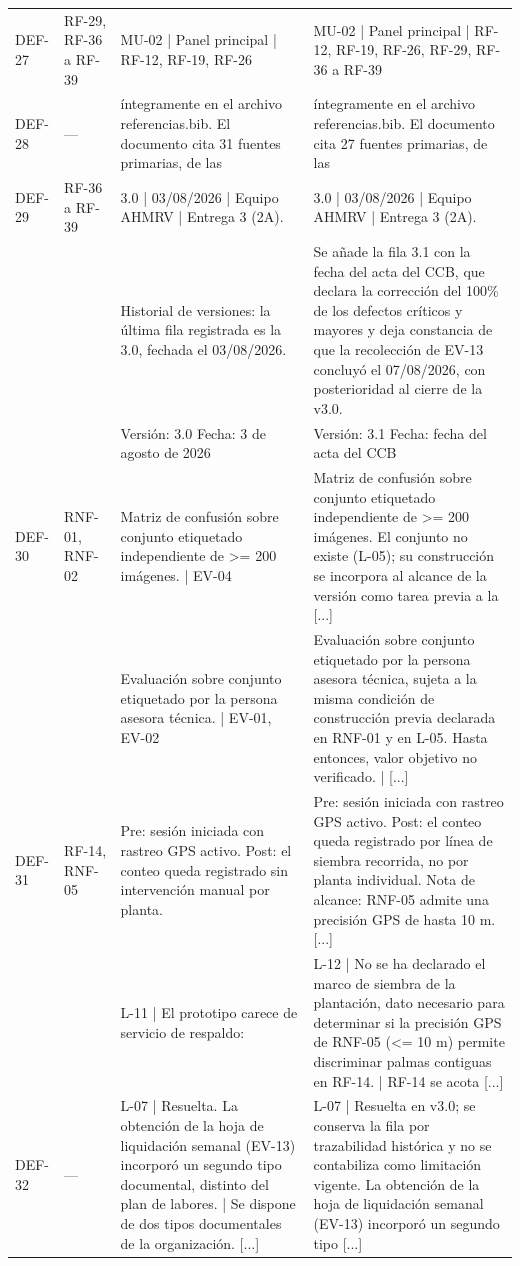 \documentclass[11pt,letterpaper]{article}
\begin{document}
{\begin{longtable}{p{1.35cm} p{2.1cm} p{5.4cm} p{5.4cm}}
DEF-27 & RF-29, RF-36 a RF-39 & MU-02 | Panel principal | RF-12, RF-19, RF-26 & MU-02 | Panel principal | RF-12, RF-19, RF-26, RF-29, RF-36 a RF-39\\
DEF-28 & — & íntegramente en el archivo referencias.bib. El documento cita 31 fuentes primarias, de las & íntegramente en el archivo referencias.bib. El documento cita 27 fuentes primarias, de las\\
DEF-29 & RF-36 a RF-39 & 3.0 | 03/08/2026 | Equipo AHMRV | Entrega 3 (2A). & 3.0 | 03/08/2026 | Equipo AHMRV | Entrega 3 (2A).\\
 &  & Historial de versiones: la última fila registrada es la 3.0, fechada el 03/08/2026. & Se añade la fila 3.1 con la fecha del acta del CCB, que declara la corrección del 100\% de los defectos críticos y mayores y deja constancia de que la recolección de EV-13 concluyó el 07/08/2026, con posterioridad al cierre de la v3.0.\\
 &  & Versión: 3.0 Fecha: 3 de agosto de 2026 & Versión: 3.1 Fecha: fecha del acta del CCB\\
DEF-30 & RNF-01, RNF-02 & Matriz de confusión sobre conjunto etiquetado independiente de >= 200 imágenes. | EV-04 & Matriz de confusión sobre conjunto etiquetado independiente de >= 200 imágenes. El conjunto no existe (L-05); su construcción se incorpora al alcance de la versión como tarea previa a la [...]\\
 &  & Evaluación sobre conjunto etiquetado por la persona asesora técnica. | EV-01, EV-02 & Evaluación sobre conjunto etiquetado por la persona asesora técnica, sujeta a la misma condición de construcción previa declarada en RNF-01 y en L-05. Hasta entonces, valor objetivo no verificado. | [...]\\
DEF-31 & RF-14, RNF-05 & Pre: sesión iniciada con rastreo GPS activo. Post: el conteo queda registrado sin intervención manual por planta. & Pre: sesión iniciada con rastreo GPS activo. Post: el conteo queda registrado por línea de siembra recorrida, no por planta individual. Nota de alcance: RNF-05 admite una precisión GPS de hasta 10 m. [...]\\
 &  & L-11 | El prototipo carece de servicio de respaldo: & L-12 | No se ha declarado el marco de siembra de la plantación, dato necesario para determinar si la precisión GPS de RNF-05 (<= 10 m) permite discriminar palmas contiguas en RF-14. | RF-14 se acota [...]\\
DEF-32 & — & L-07 | Resuelta. La obtención de la hoja de liquidación semanal (EV-13) incorporó un segundo tipo documental, distinto del plan de labores. | Se dispone de dos tipos documentales de la organización. [...] & L-07 | Resuelta en v3.0; se conserva la fila por trazabilidad histórica y no se contabiliza como limitación vigente. La obtención de la hoja de liquidación semanal (EV-13) incorporó un segundo tipo [...]\\

\end{longtable}}
\end{document}
